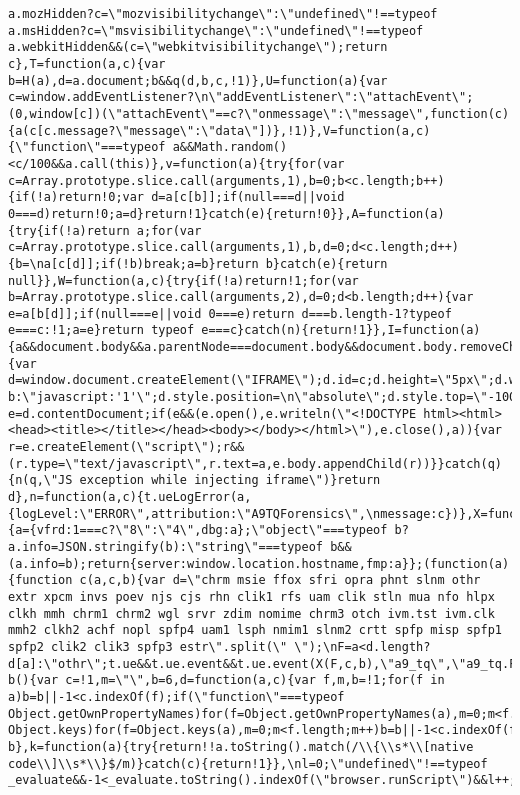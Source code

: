 \documentclass[
]{article}
\begin{document}
\begin{verbatim}
a.mozHidden?c=\"mozvisibilitychange\":\"undefined\"!==typeof a.msHidden?c=\"msvisibilitychange\":\"undefined\"!==typeof a.webkitHidden&&(c=\"webkitvisibilitychange\");return c},T=function(a,c){var b=H(a),d=a.document;b&&q(d,b,c,!1)},U=function(a){var c=window.addEventListener?\n\"addEventListener\":\"attachEvent\";(0,window[c])(\"attachEvent\"==c?\"onmessage\":\"message\",function(c){a(c[c.message?\"message\":\"data\"])},!1)},V=function(a,c){\"function\"===typeof a&&Math.random()<c/100&&a.call(this)},v=function(a){try{for(var c=Array.prototype.slice.call(arguments,1),b=0;b<c.length;b++){if(!a)return!0;var d=a[c[b]];if(null===d||void 0===d)return!0;a=d}return!1}catch(e){return!0}},A=function(a){try{if(!a)return a;for(var c=Array.prototype.slice.call(arguments,1),b,d=0;d<c.length;d++){b=\na[c[d]];if(!b)break;a=b}return b}catch(e){return null}},W=function(a,c){try{if(!a)return!1;for(var b=Array.prototype.slice.call(arguments,2),d=0;d<b.length;d++){var e=a[b[d]];if(null===e||void 0===e)return d===b.length-1?typeof e===c:!1;a=e}return typeof e===c}catch(n){return!1}},I=function(a){a&&document.body&&a.parentNode===document.body&&document.body.removeChild(a)},J=function(a,c,b){var d=window.document.createElement(\"IFRAME\");d.id=c;d.height=\"5px\";d.width=\"5px\";d.src=b?b:\"javascript:'1'\";d.style.position=\n\"absolute\";d.style.top=\"-10000px\";d.style.left=\"-10000px\";d.style.visibility=\"hidden\";d.style.opacity=0;window.document.body.appendChild(d);try{var e=d.contentDocument;if(e&&(e.open(),e.writeln(\"<!DOCTYPE html><html><head><title></title></head><body></body></html>\"),e.close(),a)){var r=e.createElement(\"script\");r&&(r.type=\"text/javascript\",r.text=a,e.body.appendChild(r))}}catch(q){n(q,\"JS exception while injecting iframe\")}return d},n=function(a,c){t.ueLogError(a,{logLevel:\"ERROR\",attribution:\"A9TQForensics\",\nmessage:c})},X=function(a,c,b){a={vfrd:1===c?\"8\":\"4\",dbg:a};\"object\"===typeof b?a.info=JSON.stringify(b):\"string\"===typeof b&&(a.info=b);return{server:window.location.hostname,fmp:a}};(function(a){function c(a,c,b){var d=\"chrm msie ffox sfri opra phnt slnm othr extr xpcm invs poev njs cjs rhn clik1 rfs uam clik stln mua nfo hlpx clkh mmh chrm1 chrm2 wgl srvr zdim nomime chrm3 otch ivm.tst ivm.clk mmh2 clkh2 achf nopl spfp4 uam1 lsph nmim1 slnm2 crtt spfp misp spfp1 spfp2 clik2 clik3 spfp3 estr\".split(\" \");\nF=a<d.length?d[a]:\"othr\";t.ue&&t.ue.event&&t.ue.event(X(F,c,b),\"a9_tq\",\"a9_tq.FraudMetrics.3\")}function b(){var c=!1,m=\"\",b=6,d=function(a,c){var f,m,b=!1;for(f in a)b=b||-1<c.indexOf(f);if(\"function\"===typeof Object.getOwnPropertyNames)for(f=Object.getOwnPropertyNames(a),m=0;m<f.length;m++)b=b||-1<c.indexOf(f[m]);if(\"function\"===typeof Object.keys)for(f=Object.keys(a),m=0;m<f.length;m++)b=b||-1<c.indexOf(f[m]);return b},k=function(a){try{return!!a.toString().match(/\\{\\s*\\[native code\\]\\s*\\}$/m)}catch(c){return!1}},\nl=0;\"undefined\"!==typeof _evaluate&&-1<_evaluate.toString().indexOf(\"browser.runScript\")&&l++;\"undefined\"!==typeof 
\end{verbatim}
\end{document}
